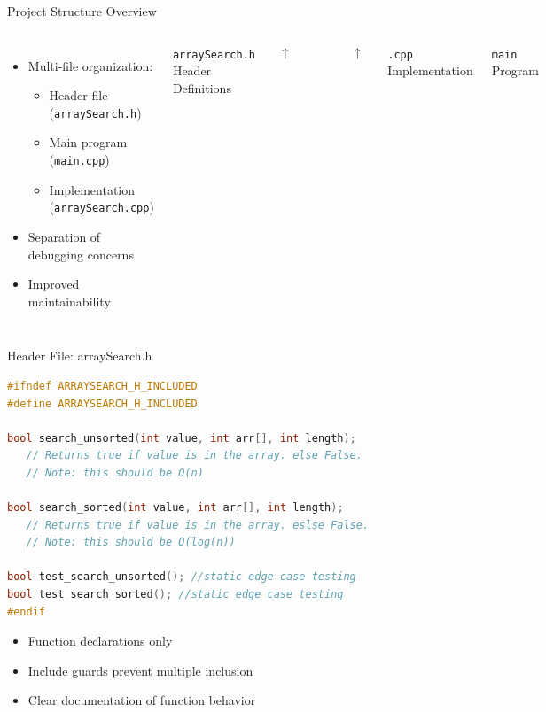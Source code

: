 \documentclass{beamer}
\begin{document}
 \begin{frame}{Project Structure Overview}
\begin{columns}
\begin{itemize}
\item Multi-file organization:
  \begin{itemize}
  \item Header file (\texttt{arraySearch.h})
   \item Main program (\texttt{main.cpp})
   \item Implementation (\texttt{arraySearch.cpp})
  \end{itemize}
  \pause

\item Separation of debugging concerns
\pause
\item Improved maintainability
\end{itemize}
\pause

\begin{block}{\texttt{arraySearch.h}}
Header Definitions
\end{block}
\vspace{-0.3cm}
\begin{align*}
\uparrow \hspace{2cm} \uparrow
\end{align*}
\vspace{-0.8cm}
\begin{columns}
\begin{block}{\texttt{.cpp}}
Implementation
\end{block}
\begin{block}{\texttt{main}}
Program
\end{block}
\end{columns}
\end{columns}
\end{frame}

\begin{frame}[fragile]{Header File: arraySearch.h}
\begin{lstlisting}[language=C++, basicstyle=\small]
#ifndef ARRAYSEARCH_H_INCLUDED
#define ARRAYSEARCH_H_INCLUDED

bool search_unsorted(int value, int arr[], int length);
   // Returns true if value is in the array. else False.
   // Note: this should be O(n)

bool search_sorted(int value, int arr[], int length);
   // Returns true if value is in the array. eslse False.
   // Note: this should be O(log(n))

bool test_search_unsorted(); //static edge case testing
bool test_search_sorted(); //static edge case testing
#endif
\end{lstlisting}
\pause

\begin{itemize}
\item Function declarations only
\item Include guards prevent multiple inclusion
\item Clear documentation of function behavior
\end{itemize}
\end{frame}
\end{document}

